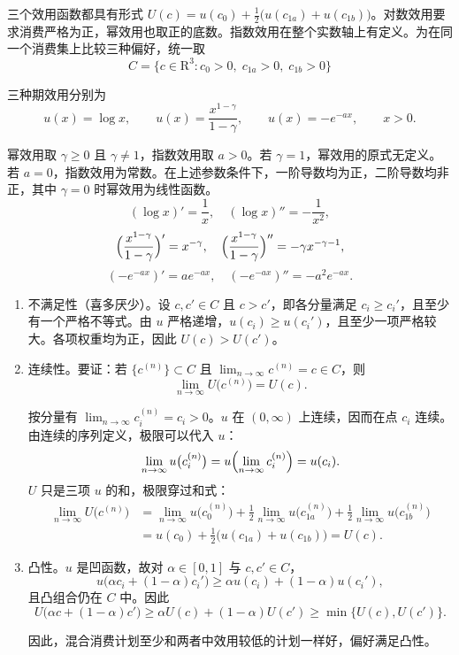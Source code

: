 \begin{solution}[label-content={证明},blank-type=manual,blank-vsep=9\baselineskip]
三个效用函数都具有形式 $U(c)=u(c_{0})+\tfrac12\bigl(u(c_{1a})+u(c_{1b})\bigr)$。对数效用要求消费严格为正，幂效用也取正的底数。指数效用在整个实数轴上有定义。为在同一个消费集上比较三种偏好，统一取
\[
    C=\bigl\{c\in\mathrm{R}^{3}:c_{0}>0,\;c_{1a}>0,\;c_{1b}>0\bigr\}
\]

三种期效用分别为
\[
    u(x)=\log x,\qquad
    u(x)=\frac{x^{1-\gamma}}{1-\gamma},\qquad
    u(x)=-e^{-ax},\qquad x>0.
\]

幂效用取 $\gamma\ge 0$ 且 $\gamma\ne 1$，指数效用取 $a>0$。若 $\gamma=1$，幂效用的原式无定义。若 $a=0$，指数效用为常数。在上述参数条件下，一阶导数均为正，二阶导数均非正，其中 $\gamma=0$ 时幂效用为线性函数。
\[
    (\log x)'=\frac1x,\quad (\log x)''=-\frac1{x^{2}},
\]
\[
    \Bigl(\frac{x^{1-\gamma}}{1-\gamma}\Bigr)'=x^{-\gamma},\quad
    \Bigl(\frac{x^{1-\gamma}}{1-\gamma}\Bigr)''=-\gamma x^{-\gamma-1},
\]
\[
    (-e^{-ax})'=ae^{-ax},\quad (-e^{-ax})''=-a^{2}e^{-ax}.
\]

\begin{enumerate}[label=(\alph*)]
    \item 不满足性（喜多厌少）。设 $c,c'\in C$ 且 $c>c'$，即各分量满足 $c_i\ge c_i'$，且至少有一个严格不等式。由 $u$ 严格递增，$u(c_i)\ge u(c_i')$，且至少一项严格较大。各项权重均为正，因此 $U(c)>U(c')$。
    \item 连续性。要证：若 $\{c^{(n)}\}\subset C$ 且 \(\lim_{n\to\infty}c^{(n)}=c\in C\)，则
    \[
        \lim_{n\to\infty}U\bigl(c^{(n)}\bigr)=U(c).
    \]

    按分量有 \(\lim_{n\to\infty}c_{i}^{(n)}=c_{i}>0\)。\(u\) 在 \((0,\infty)\) 上连续，因而在点 \(c_{i}\) 连续。由连续的序列定义，极限可以代入 \(u\)：
    \[
        \lim_{n\to\infty}u\bigl(c_{i}^{(n)}\bigr)=u\Bigl(\lim_{n\to\infty}c_{i}^{(n)}\Bigr)=u(c_{i}).
    \]
    $U$ 只是三项 $u$ 的和，极限穿过和式：
    \[
        \begin{aligned}
            \lim_{n\to\infty}U\bigl(c^{(n)}\bigr)
            &=\lim_{n\to\infty}u\bigl(c_{0}^{(n)}\bigr)
            +\tfrac12\lim_{n\to\infty}u\bigl(c_{1a}^{(n)}\bigr)
            +\tfrac12\lim_{n\to\infty}u\bigl(c_{1b}^{(n)}\bigr)\\
            &=u(c_{0})+\tfrac12\bigl(u(c_{1a})+u(c_{1b})\bigr)
            =U(c).
        \end{aligned}
    \]
    \item 凸性。$u$ 是凹函数，故对 $\alpha\in[0,1]$ 与 $c,c'\in C$，
    \[
        u\bigl(\alpha c_{i}+(1-\alpha)c_{i}'\bigr)\ge\alpha u(c_{i})+(1-\alpha)u(c_{i}'),
    \]
    且凸组合仍在 $C$ 中。因此
    \[
        U\bigl(\alpha c+(1-\alpha)c'\bigr)
        \ge\alpha U(c)+(1-\alpha)U(c')
        \ge\min\{U(c),U(c')\}.
    \]

    因此，混合消费计划至少和两者中效用较低的计划一样好，偏好满足凸性。
\end{enumerate}
\end{solution}

